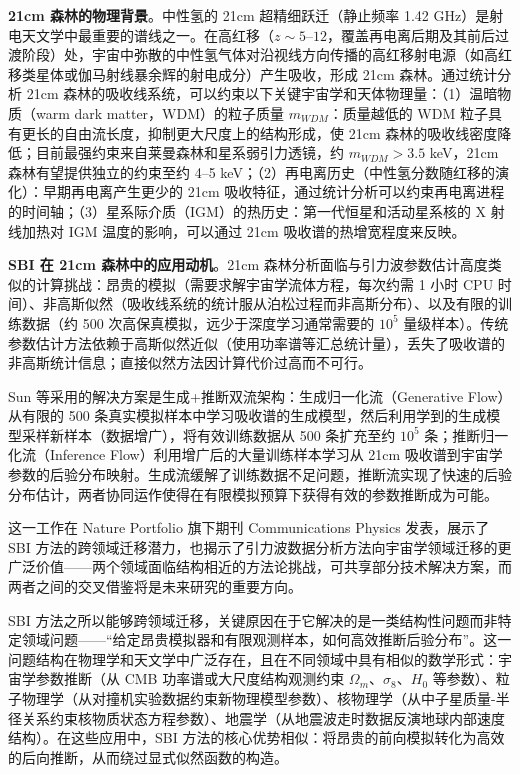 \textbf{21cm 森林的物理背景}。中性氢的 21cm 超精细跃迁（静止频率 1.42 GHz）是射电天文学中最重要的谱线之一。在高红移（$z \sim 5$--$12$，覆盖再电离后期及其前后过渡阶段）处，宇宙中弥散的中性氢气体对沿视线方向传播的高红移射电源（如高红移类星体或伽马射线暴余辉的射电成分）产生吸收，形成 21cm 森林。通过统计分析 21cm 森林的吸收线系统，可以约束以下关键宇宙学和天体物理量：（1）温暗物质（warm dark matter，WDM）的粒子质量 $m_{WDM}$：质量越低的 WDM 粒子具有更长的自由流长度，抑制更大尺度上的结构形成，使 21cm 森林的吸收线密度降低；目前最强约束来自莱曼森林和星系弱引力透镜，约 $m_{WDM} > 3.5$ keV，21cm 森林有望提供独立的约束至约 4--5 keV；（2）再电离历史（中性氢分数随红移的演化）：早期再电离产生更少的 21cm 吸收特征，通过统计分析可以约束再电离进程的时间轴；（3）星系际介质（IGM）的热历史：第一代恒星和活动星系核的 X 射线加热对 IGM 温度的影响，可以通过 21cm 吸收谱的热增宽程度来反映。

\textbf{SBI 在 21cm 森林中的应用动机}。21cm 森林分析面临与引力波参数估计高度类似的计算挑战：昂贵的模拟（需要求解宇宙学流体方程，每次约需 1 小时 CPU 时间）、非高斯似然（吸收线系统的统计服从泊松过程而非高斯分布）、以及有限的训练数据（约 500 次高保真模拟，远少于深度学习通常需要的 $10^5$ 量级样本）。传统参数估计方法依赖于高斯似然近似（使用功率谱等汇总统计量），丢失了吸收谱的非高斯统计信息；直接似然方法因计算代价过高而不可行。

Sun 等采用的解决方案是生成+推断双流架构：生成归一化流（Generative Flow）从有限的 500 条真实模拟样本中学习吸收谱的生成模型，然后利用学到的生成模型采样新样本（数据增广），将有效训练数据从 500 条扩充至约 $10^5$ 条；推断归一化流（Inference Flow）利用增广后的大量训练样本学习从 21cm 吸收谱到宇宙学参数的后验分布映射。生成流缓解了训练数据不足问题，推断流实现了快速的后验分布估计，两者协同运作使得在有限模拟预算下获得有效的参数推断成为可能。

这一工作在 Nature Portfolio 旗下期刊 Communications Physics 发表，展示了 SBI 方法的跨领域迁移潜力，也揭示了引力波数据分析方法向宇宙学领域迁移的更广泛价值——两个领域面临结构相近的方法论挑战，可共享部分技术解决方案，而两者之间的交叉借鉴将是未来研究的重要方向。

SBI 方法之所以能够跨领域迁移，关键原因在于它解决的是一类结构性问题而非特定领域问题——“给定昂贵模拟器和有限观测样本，如何高效推断后验分布”。这一问题结构在物理学和天文学中广泛存在，且在不同领域中具有相似的数学形式：宇宙学参数推断（从 CMB 功率谱或大尺度结构观测约束 $\Omega_m$、$\sigma_8$、$H_0$ 等参数）、粒子物理学（从对撞机实验数据约束新物理模型参数）、核物理学（从中子星质量-半径关系约束核物质状态方程参数）、地震学（从地震波走时数据反演地球内部速度结构）。在这些应用中，SBI 方法的核心优势相似：将昂贵的前向模拟转化为高效的后向推断，从而绕过显式似然函数的构造。

